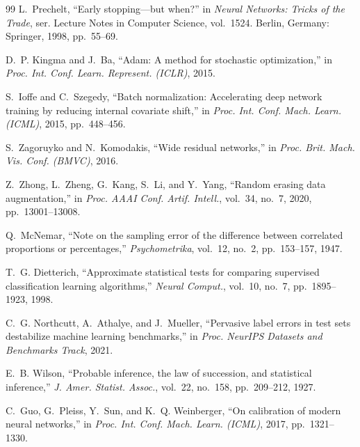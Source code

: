 \documentclass[conference]{IEEEtran}
\begin{document}
\begin{thebibliography}{99}
L.~Prechelt, ``Early stopping---but when?'' in \emph{Neural Networks: Tricks of the Trade}, ser. Lecture Notes in
Computer Science, vol.~1524. Berlin, Germany: Springer, 1998, pp.~55--69.

D.~P. Kingma and J.~Ba, ``Adam: A method for stochastic optimization,'' in \emph{Proc. Int. Conf. Learn. Represent.
(ICLR)}, 2015.

S.~Ioffe and C.~Szegedy, ``Batch normalization: Accelerating deep network training by reducing internal covariate
shift,'' in \emph{Proc. Int. Conf. Mach. Learn. (ICML)}, 2015, pp.~448--456.

S.~Zagoruyko and N.~Komodakis, ``Wide residual networks,'' in \emph{Proc. Brit. Mach. Vis. Conf. (BMVC)}, 2016.

Z.~Zhong, L.~Zheng, G.~Kang, S.~Li, and Y.~Yang, ``Random erasing data augmentation,'' in \emph{Proc. AAAI Conf. Artif.
Intell.}, vol.~34, no.~7, 2020, pp.~13001--13008.

Q.~McNemar, ``Note on the sampling error of the difference between correlated proportions or percentages,''
\emph{Psychometrika}, vol.~12, no.~2, pp.~153--157, 1947.

T.~G. Dietterich, ``Approximate statistical tests for comparing supervised classification learning algorithms,''
\emph{Neural Comput.}, vol.~10, no.~7, pp.~1895--1923, 1998.

C.~G. Northcutt, A.~Athalye, and J.~Mueller, ``Pervasive label errors in test sets destabilize machine learning
benchmarks,'' in \emph{Proc. NeurIPS Datasets and Benchmarks Track}, 2021.

E.~B. Wilson, ``Probable inference, the law of succession, and statistical inference,'' \emph{J. Amer. Statist.
Assoc.}, vol.~22, no.~158, pp.~209--212, 1927.

C.~Guo, G.~Pleiss, Y.~Sun, and K.~Q. Weinberger, ``On calibration of modern neural networks,'' in \emph{Proc. Int.
Conf. Mach. Learn. (ICML)}, 2017, pp.~1321--1330.

\end{thebibliography}
\end{document}
